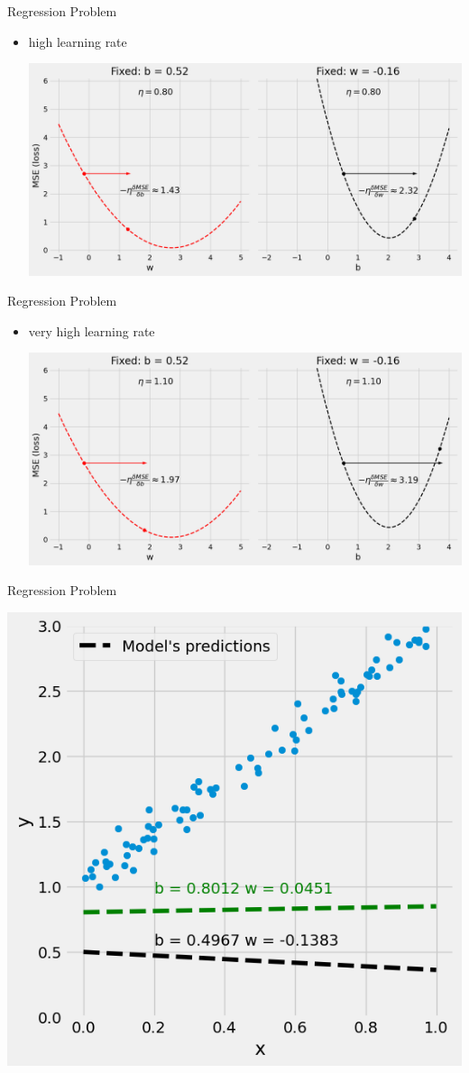 \documentclass[pdflatex,compress,mathserif]{beamer}
\begin{document}
\begin{frame}{Regression Problem}
	\begin{itemize}
		\item high learning rate
		\begin{center}
			\includegraphics[width=\linewidth]{img/12}
		\end{center}
	\end{itemize}
\end{frame}

\begin{frame}{Regression Problem}
	\begin{itemize}
		\item very high learning rate
		\begin{center}
			\includegraphics[width=\linewidth]{img/13}
		\end{center}
	\end{itemize}
\end{frame}

\begin{frame}{Regression Problem}
	\begin{center}
		\includegraphics[width=0.6\linewidth]{img/10}
	\end{center}
\end{frame}
\end{document}
